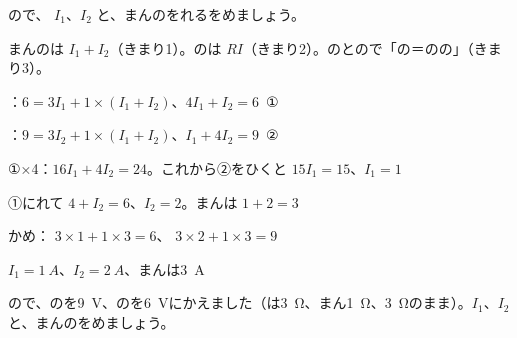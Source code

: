 \begin{reidai}[\R{回路}{かい|ろ}の\R{電流}{でん|りゅう}を\R{求}{もと}める]
\noindent\begin{minipage}[t]{0.34\linewidth}
ので、 $I_1$、$I_2$ と、まんのをれるをめましょう。
\end{minipage}\hfill
\begin{minipage}[t]{0.64\linewidth}\vspace{0pt}\centering
{}
\end{minipage}\par
\kangaekata まんのは $I_1+I_2$（きまり1）。のは $RI$（きまり2）。のとので「の＝のの」（きまり3）。\par
\shiki {}：$6=3I_1+1\times(I_1+I_2)$、$4I_1+I_2=6$\ ①\par
\hspace*{2.6\zw}：$9=3I_2+1\times(I_1+I_2)$、$I_1+4I_2=9$\ ②\par
\hspace*{2.6\zw}①×4：$16I_1+4I_2=24$。これから②をひくと $15I_1=15$、$I_1=1$\par
\hspace*{2.6\zw}①にれて $4+I_2=6$、$I_2=2$。まんは $1+2=3$\par
\hspace*{2.6\zw}かめ： $3\times1+1\times3=6$、 $3\times2+1\times3=9$\par
\kotae $I_1=\qty{1}{A}$、$I_2=\qty{2}{A}$、まんは\qty{3}{A}
\end{reidai}

\begin{jibun}
ので、のを\qty{9}{V}、のを\qty{6}{V}にかえました（は\qty{3}{\ohm}、まん\qty{1}{\ohm}、\qty{3}{\ohm}のまま）。$I_1$、$I_2$ と、まんのをめましょう。
\end{jibun}

